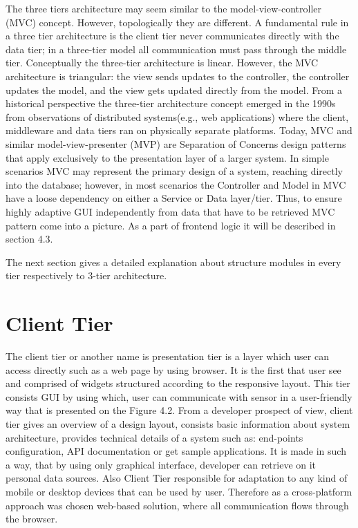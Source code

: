    The three tiers architecture may seem similar to the model-view-controller (MVC) concept. However, topologically they are different. A fundamental rule in a three tier architecture is the client tier never communicates directly with the data tier; in a three-tier model all communication must pass through the middle tier. Conceptually the three-tier architecture is linear. However, the MVC architecture is triangular: the view sends updates to the controller, the controller updates the model, and the view gets updated directly from the model.
   \newline
    From a historical perspective the three-tier architecture concept emerged in the 1990s from observations of distributed systems\cite{wiki:3tier}(e.g., web applications) where the client, middleware and data tiers ran on physically separate platforms. Today, MVC and similar model-view-presenter (MVP) are Separation of Concerns design patterns that apply exclusively to the presentation layer of a larger system. In simple scenarios MVC may represent the primary design of a system, reaching directly into the database; however, in most scenarios the Controller and Model in MVC have a loose dependency on either a Service or Data layer/tier. Thus, to ensure highly adaptive GUI independently from data that have to be retrieved MVC pattern come into a picture. As a part of frontend logic it will be described in section 4.3.

  The next section gives a detailed explanation about structure modules in every tier respectively to 3-tier architecture.

\section{Client Tier}
  The client tier or another name is presentation tier is a layer which user can access directly such as a web page by using browser. It is the first that user see and comprised of widgets structured according to the responsive layout. This tier consists GUI by using which, user can communicate with sensor in a user-friendly way that is presented on the Figure 4.2. From a developer prospect of view, client tier gives an overview of a design layout, consists basic information about system architecture, provides technical details of a system such as: end-points configuration, API documentation or get sample applications. It is made in such a way, that by using only graphical interface, developer can retrieve on it personal data sources. Also Client Tier responsible for adaptation to any kind of mobile or desktop devices that can be used by user. Therefore as a cross-platform approach was chosen web-based solution, where all communication flows through the browser. 

